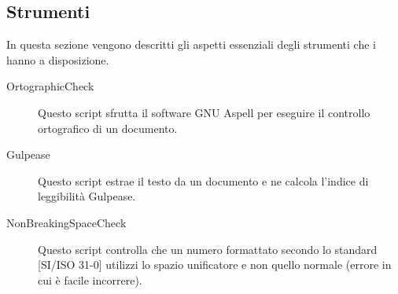 	\subsection{Strumenti}
		In questa sezione vengono descritti gli aspetti essenziali degli strumenti che i  hanno a disposizione.
		\begin{description}
			\item[OrtographicCheck] Questo script sfrutta il software GNU Aspell per eseguire il controllo ortografico di un documento.
			\item[Gulpease] Questo script estrae il testo da un documento e ne calcola l'indice di leggibilità Gulpease.
			\item[NonBreakingSpaceCheck] Questo script controlla che un numero formattato secondo lo standard [SI/ISO 31-0] utilizzi lo spazio unificatore e non quello normale (errore in cui è facile incorrere).
		\end{description}
